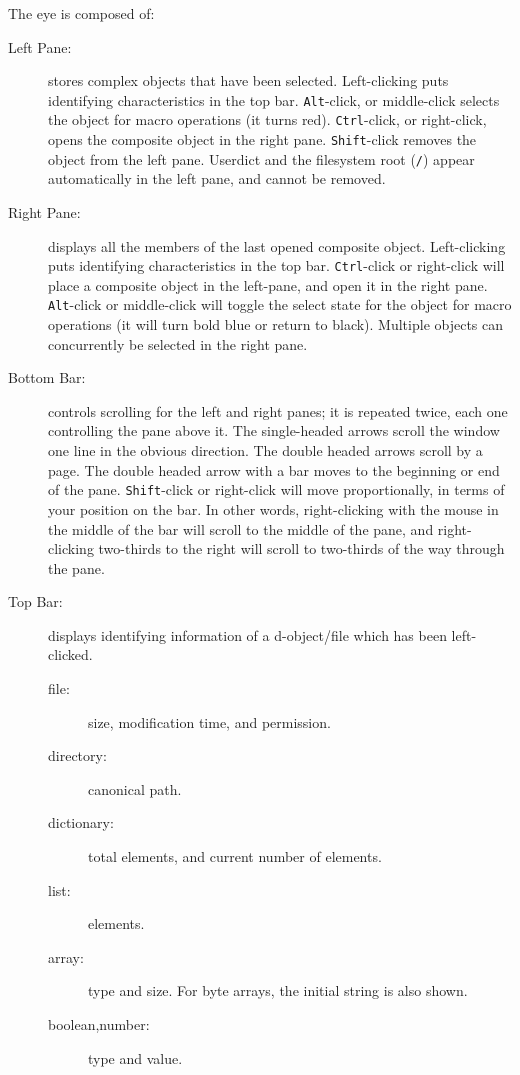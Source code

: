 \documentclass[12pt]{article}
\begin{document}
The eye is composed of:
\begin{description}
  \item[Left Pane:] stores complex objects that have been selected.
  Left-clicking puts identifying characteristics in the top bar.
  \verb$Alt$-click, or middle-click selects the object for macro
  operations (it turns red). \verb$Ctrl$-click, or right-click, opens
  the composite object in the right pane. \verb$Shift$-click removes
  the object from the left pane. Userdict and the filesystem root
  (\verb$/$) appear automatically in the left pane, and cannot be
  removed.
  \item[Right Pane:] displays all the members of the last opened
  composite object. Left-clicking puts identifying characteristics in
  the top bar. \verb$Ctrl$-click or right-click will place a composite
  object in the left-pane, and open it in the right pane.
  \verb$Alt$-click or middle-click will toggle the select state for
  the object for macro operations (it will turn bold blue or return to
  black). Multiple objects can concurrently be selected in the right
  pane.
  \item[Bottom Bar:] controls scrolling for the left and right panes;
  it is repeated twice, each one controlling the pane above it. The
  single-headed arrows scroll the window one line in the obvious
  direction. The double headed arrows scroll by a page. The double
  headed arrow with a bar moves to the beginning or end of the pane.
  \verb$Shift$-click or right-click will move proportionally, in terms
  of your position on the bar. In other words, right-clicking with the
  mouse in the middle of the bar will scroll to the middle of the
  pane, and right-clicking two-thirds to the right will scroll to
  two-thirds of the way through the pane.
  \item[Top Bar:] displays identifying information of a
  d-object/file which has been left-clicked. 
  \begin{description}
    \item[file:] size, modification time, and permission.
    \item[directory:] canonical path.
    \item[dictionary:] total elements, and current number of elements.
    \item[list:] elements.
    \item[array:] type and size. For byte arrays, the initial string is
    also shown.
    \item[boolean,number:] type and value.
  \end{description}
\end{description}
\end{document}
